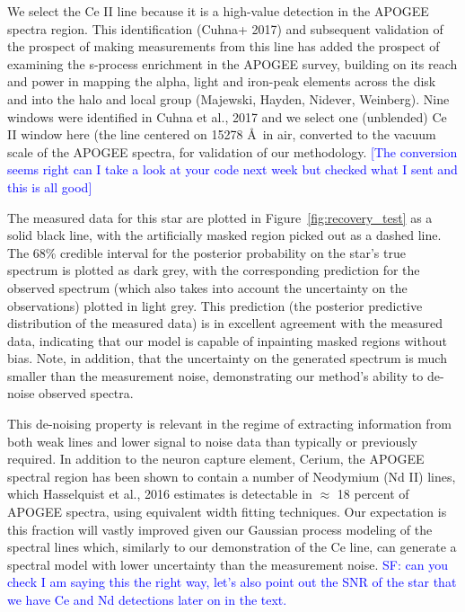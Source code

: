 \documentclass[a4paper,fleqn,usenatbib]{mnras}
\begin{document}
We select the Ce II line because it is a high-value detection in the APOGEE spectra region. This identification (Cuhna+ 2017) and subsequent validation of the prospect of making measurements from this line has added the prospect of examining the s-process enrichment in the APOGEE survey, building on its reach and power in mapping the alpha, light and iron-peak elements across the disk and into the halo and local group (Majewski, Hayden, Nidever, Weinberg). Nine windows were identified in Cuhna et al., 2017 and we select one (unblended) Ce II window here (the line centered on 15278 \AA\ in air, converted to the vacuum scale of the APOGEE spectra, for validation of our methodology. \textcolor{blue}{[The conversion seems right can I take a look at your code next week but checked what I sent and this is all good]}


The measured data for this star are plotted in Figure~\ref{fig:recovery_test} as a solid black line, with the artificially masked region picked out as a dashed line. The 68\% credible interval for the posterior probability on the star's true spectrum is plotted as dark grey, with the corresponding prediction for the observed spectrum (which also takes into account the uncertainty on the observations) plotted in light grey. This prediction (the posterior predictive distribution of the measured data) is in excellent agreement with the measured data, indicating that our model is capable of inpainting masked regions without bias. Note, in addition, that the uncertainty on the generated spectrum is much smaller than the measurement noise, demonstrating our method's ability to de-noise observed spectra.

This de-noising property is relevant in the regime of extracting information from both weak lines and lower signal to noise data than typically or previously required. In addition to the neuron capture element, Cerium, the APOGEE spectral region has been shown to contain a number of Neodymium (Nd II) lines, which Hasselquist et al., 2016 estimates is detectable in $\approx$ 18 percent of APOGEE spectra, using equivalent width fitting techniques. Our expectation is this fraction will vastly improved given our Gaussian process modeling of the spectral lines which, similarly to our demonstration of the Ce line, can generate a spectral model with lower uncertainty than the measurement noise. \textcolor{blue}{SF: can you check I am saying this the right way, let's also point out the SNR of the star that we have Ce and Nd detections later on in the text.}
\end{document}
